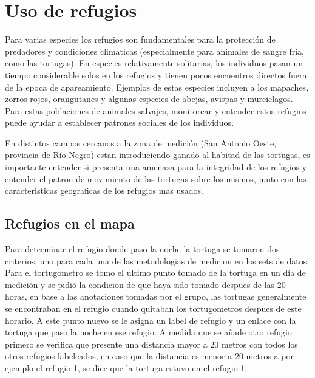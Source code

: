 \chapter{Uso de refugios}
Para varias especies los refugios son fundamentales para la protección de predadores y  condiciones climaticas (especialmente para animales de sangre fría, como las tortugas). En especies relativamente solitarias, los individuos pasan un tiempo considerable solos en los refugios y tienen pocos encuentros directos fuera de la epoca de apareamiento.
Ejemplos de estas especies incluyen a los mapaches, zorros rojos, orangutanes y algunas especies de abejas, avispas y murcielagos. Para estas poblaciones de animales salvajes, monitorear y entender estos refugios puede ayudar a establecer patrones sociales de los individuos. 

En distintos campos cercanos a la zona de medición (San Antonio Oeste, provincia de Río Negro) estan introduciendo ganado al habitad de las tortugas, es importante entender si presenta una amenaza para la integridad de los refugios y entender el patron de movimiento  de las tortugas sobre los mismos, junto con las caracteristicas geograficas de los refugios mas usados.

\section{Refugios en el mapa}
Para determinar el refugio donde paso la noche la tortuga se tomaron dos criterios, uno para cada una de las metodologias de medicion en los sets de datos. Para el tortugometro se tomo el ultimo punto tomado de la tortuga en un día de medición y se pidió la condicion de que haya sido tomado despues de las 20 horas, en base a las anotaciones tomadas por el grupo, las tortugas generalmente  se encontraban en el refugio cuando quitaban los tortugometros despues de este horario. A este punto nuevo se le asigna un label de refugio y un enlace con la tortuga que paso la noche en ese refugio. A medida que se añade otro refugio primero se verifica que presente una distancia mayor a 20 metros con todos los otros refugios labeleados, en caso que la distancia es menor a 20 metros a por ejemplo el refugio 1, se dice que la tortuga estuvo en el refugio 1. 

